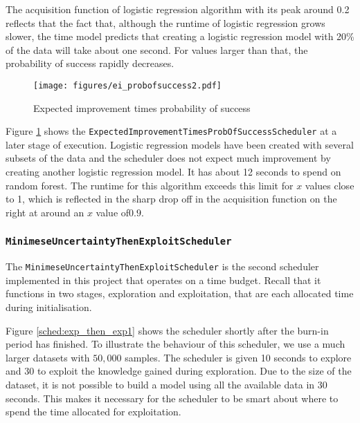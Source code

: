 \documentclass[a4paper,12pt,twoside,openright]{report}
\begin{document}
The acquisition function of logistic regression algorithm with its peak around 0.2 reflects that the fact that, although the runtime of logistic regression grows slower, the time model predicts that creating a logistic regression model with 20\% of the data will take about one second. For values larger than that, the probability of success rapidly decreases.

\begin{figure}
\centering
  \texttt{[image: figures/ei\_probofsuccess2.pdf]}
  \caption{Expected improvement times probability of success}
  \label{sched:expimprpertime02}
\end{figure}

Figure \ref{sched:expimprpertime02} shows the \texttt{ExpectedImprovementTimesProbOfSuccessScheduler} at a later stage of execution. Logistic regression models have been created with several subsets of the data and the scheduler does not expect much improvement by creating another logistic regression model. It has about 12 seconds to spend on random forest. The runtime for this algorithm exceeds this limit for $x$ values close to 1, which is reflected in the sharp drop off in the acquisition function on the right at around an $x$ value of$0.9$.

\subsubsection{\texttt{MinimeseUncertaintyThenExploitScheduler}}

The \texttt{MinimeseUncertaintyThenExploitScheduler} is the second scheduler implemented in this project that operates on a time budget. Recall that it functions in two stages, exploration and exploitation, that are each allocated time during initialisation.

Figure \ref{sched:exp_then_exp1} shows the scheduler shortly after the burn-in period has finished. To illustrate the behaviour of this scheduler, we use a much larger datasets with $50,000$ samples. The scheduler is given 10 seconds to explore and 30 to exploit the knowledge gained during exploration. Due to the size of the dataset, it is not possible to build a model using all the available data in 30 seconds. This makes it necessary for the scheduler to be smart about where to spend the time allocated for exploitation.

\end{document}
